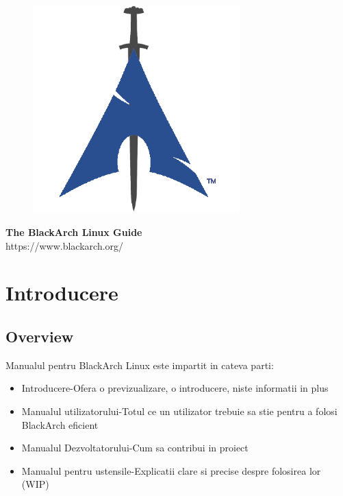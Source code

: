 \documentclass[a4paper, oneside, 11pt]{book}
\begin{document}
\pagestyle{empty}
\begin{center}
\begin{figure}[htbp]
\centering
\vspace{0.5cm}
\includegraphics[width=8cm]{images/logo.png}
\label{fig:logo}
\end{figure}
\vspace{0.5cm}
\Huge{\textbf{The BlackArch Linux Guide}}\\
\vspace{1cm}
\Large{\color{blue}https://www.blackarch.org/}\\
\vspace{0.5cm}
\end{center}
\newpage
\tableofcontents
\newpage
\pagestyle{fancy}


\chapter{Introducere}

\section{Overview}
Manualul pentru BlackArch Linux este impartit in cateva parti:
\begin{itemize}

\item Introducere-Ofera o previzualizare, o introducere, niste informatii in plus
\item Manualul utilizatorului-Totul ce un utilizator trebuie sa stie pentru a folosi BlackArch eficient
\item Manualul Dezvoltatorului-Cum sa contribui in proiect
\item Manualul pentru ustensile-Explicatii clare si precise despre folosirea lor (WIP)
\end{itemize}
\end{document}
